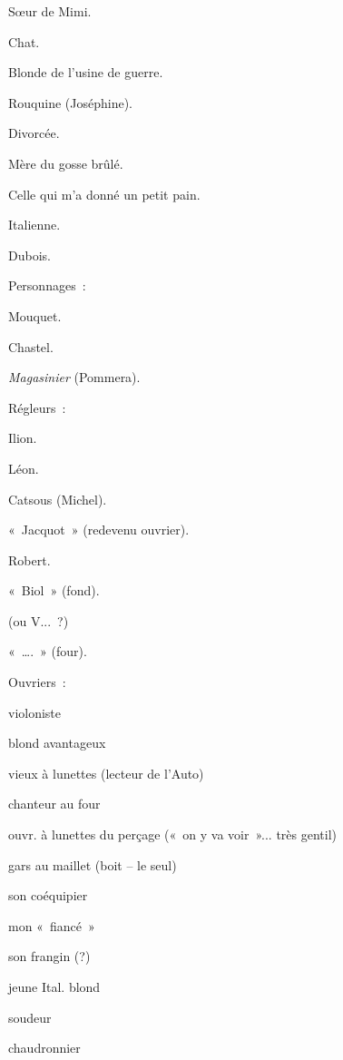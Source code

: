 \documentclass[french,twoside]{book} %
\begin{document}
Sœur de Mimi.\par
Chat.\par
Blonde de l'usine de guerre.\par
Rouquine (Joséphine).\par
Divorcée.\par
Mère du gosse brûlé.\par
Celle qui m'a donné un petit pain.\par
Italienne.\par
Dubois.\par
Personnages :\par
Mouquet.\par
Chastel.\par
{\itshape Magasinier} (Pommera).\par
Régleurs :\par
Ilion.\par
Léon.\par
Catsous (Michel).\par
« Jacquot » (redevenu ouvrier).\par
Robert.\par
« Biol » (fond).\par
(ou V... ?)\par
« …. » (four).\par
Ouvriers :\par
violoniste\par
blond avantageux\par
vieux à lunettes (lecteur de l'Auto)\par
chanteur au four\par
ouvr. à lunettes du perçage (« on y va voir »... très gentil)\par
gars au maillet (boit – le seul)\par
son coéquipier\par
mon « fiancé »\par
son frangin (?)\par
jeune Ital. blond\par
soudeur\par
chaudronnier
\end{document}
